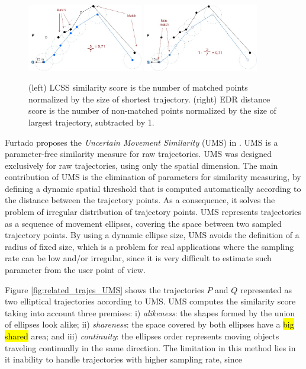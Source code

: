 \documentclass[12pt]{article}
\begin{document}
\begin{figure}[h]
\centering
\includegraphics[width=0.45\textwidth]{Related_Works/related_trajes-LCSS.jpg}
\includegraphics[width=0.45\textwidth]{Related_Works/related_trajes-EDR.jpg}
\caption{\label{fig:related_trajes_EDR_LCSS}(left) LCSS similarity score is the number of matched points normalized by the size of shortest trajectory. (right) EDR distance score is the number of non-matched points normalized by the size of largest trajectory, subtracted by 1.}
\end{figure}

Furtado proposes the \emph{Uncertain Movement Similarity} (UMS) in \cite{Furtado-UMS-2018}. UMS is a parameter-free similarity measure for raw trajectories. UMS was designed exclusively for raw trajectories, using only the spatial dimension. The main contribution of UMS is the elimination of parameters for similarity measuring, by defining a dynamic spatial threshold that is computed automatically according to the distance between the trajectory points. As a consequence, it solves the problem of irregular distribution of trajectory points. UMS represents trajectories as a sequence of movement ellipses, covering the space between two sampled trajectory points.
By using a dynamic ellipse size,  UMS avoids the definition of a radius of fixed size, which is a problem for real applications where the sampling rate can be low and/or irregular, since it is very difficult to estimate such parameter from the user point of view.

Figure \ref{fig:related_trajes_UMS} shows the trajectories $P$ and $Q$ represented as two elliptical trajectories according to UMS. UMS computes the similarity score taking into account three premises: i) \textit{alikeness}: the shapes formed by the union of ellipses look alike; ii) \textit{shareness}: the space covered by both ellipses have a \hl{big shared} area; and iii) \textit{continuity}: the ellipses order represents moving objects traveling continually in the same direction. The limitation in this method lies in it inability to handle trajectories with higher sampling rate, since 
\end{document}
